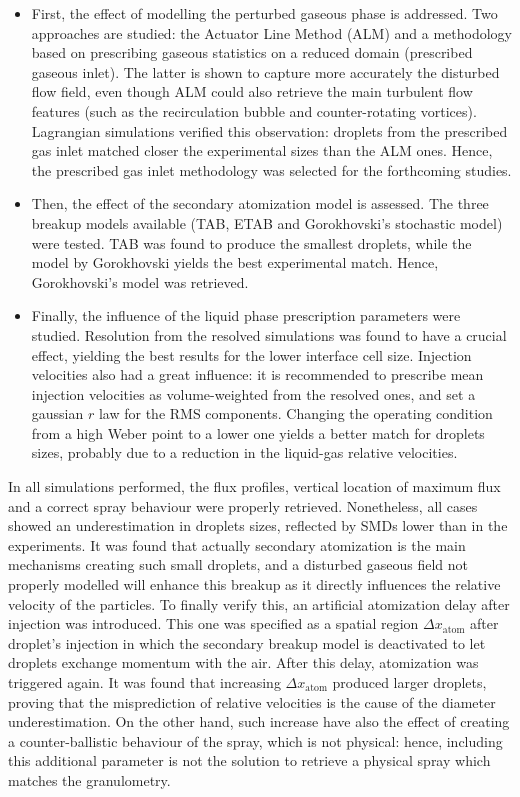 \begin{itemize}


		\item First, the effect of modelling the perturbed gaseous phase is addressed. Two approaches are studied: the Actuator Line Method (ALM) and a methodology based on prescribing gaseous statistics on a reduced domain (prescribed gaseous inlet). The latter is shown to capture more accurately the disturbed flow field, even though ALM could also retrieve the main turbulent flow features (such as the recirculation bubble and counter-rotating vortices). Lagrangian simulations verified this observation: droplets from the prescribed gas inlet matched closer the experimental sizes than the ALM ones. Hence, the prescribed gas inlet methodology was selected for the forthcoming studies.
	
	\item Then, the effect of the secondary atomization model is assessed. The three breakup models available (TAB, ETAB and Gorokhovski's stochastic model) were tested. TAB was found to produce the smallest droplets, while the model by Gorokhovski yields the best experimental match. Hence, Gorokhovski's model was retrieved.
	
	\item Finally, the influence of the liquid phase prescription parameters were studied. Resolution from the resolved simulations was found to have a crucial effect, yielding the best results for the lower interface cell size. Injection velocities also had a great influence: it is recommended to prescribe mean injection velocities as volume-weighted from the resolved ones, and set a gaussian $r$ law for the
RMS components. Changing the operating condition from a high Weber point to a lower one yields a better match for droplets sizes, probably due to a reduction in the liquid-gas relative velocities.
	
\end{itemize}

In all simulations performed, the flux profiles, vertical location of maximum flux and a correct spray behaviour were properly retrieved. Nonetheless, all cases showed an underestimation in droplets sizes, reflected by SMDs lower than in the experiments. It was found that actually secondary atomization is the main mechanisms creating such small droplets, and a disturbed gaseous field not properly modelled will enhance this breakup as it directly influences the relative velocity of the particles. To finally verify this,  an artificial atomization delay after injection was introduced. This one was specified as a spatial region $\Delta x_\mathrm{atom}$ after droplet's injection in which the secondary breakup model is deactivated to let droplets exchange momentum with the air. After this delay, atomization was triggered again. It was found that increasing $\Delta x_\mathrm{atom}$ produced larger droplets, proving that the misprediction of relative velocities is the cause of the diameter underestimation. On the other hand, such increase have also the effect of creating a counter-ballistic behaviour of the spray, which is not physical: hence, including this additional parameter is not the solution to retrieve a physical spray which matches the granulometry. 

